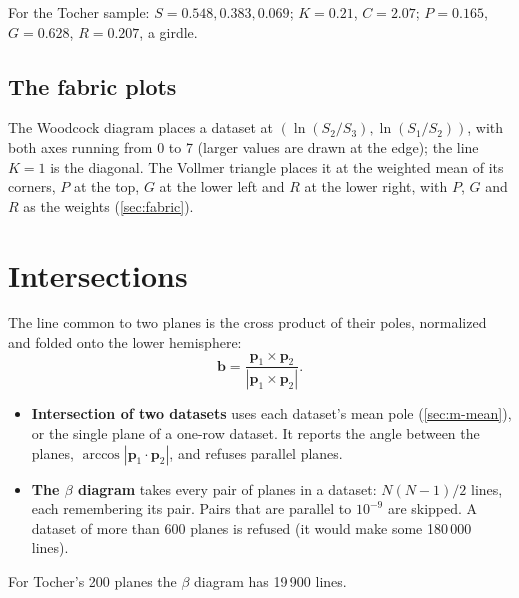For the Tocher sample: $S = 0.548, 0.383, 0.069$; $K = 0.21$, $C = 2.07$; $P = 0.165$, $G = 0.628$,
$R = 0.207$, a girdle.

\subsection{The fabric plots}

The Woodcock diagram places a dataset at $(\ln(S_2/S_3), \ln(S_1/S_2))$, with both axes running from 0 to
7 (larger values are drawn at the edge); the line $K = 1$ is the diagonal. The Vollmer triangle places it
at the weighted mean of its corners, $P$ at the top, $G$ at the lower left and $R$ at the lower right,
with $P$, $G$ and $R$ as the weights (\cref{sec:fabric}).

\begin{center}
\end{center}

\section{Intersections}\label{sec:m-derived}

The line common to two planes is the cross product of their poles, normalized and folded onto the lower
hemisphere:
\[ \mathbf{b} = \frac{\mathbf{p}_1 \times \mathbf{p}_2}{|\mathbf{p}_1 \times \mathbf{p}_2|}. \]
\begin{itemize}
\item \textbf{Intersection of two datasets} uses each dataset's mean pole (\cref{sec:m-mean}), or the
single plane of a one-row dataset. It reports the angle between the planes, $\arccos|\mathbf{p}_1 \cdot
\mathbf{p}_2|$, and refuses parallel planes.
\item \textbf{The $\beta$ diagram} takes every pair of planes in a dataset: $N(N-1)/2$ lines, each
remembering its pair. Pairs that are parallel to $10^{-9}$ are skipped. A dataset of more than 600 planes
is refused (it would make some 180\,000 lines).
\end{itemize}
For Tocher's 200 planes the $\beta$ diagram has 19\,900 lines.

